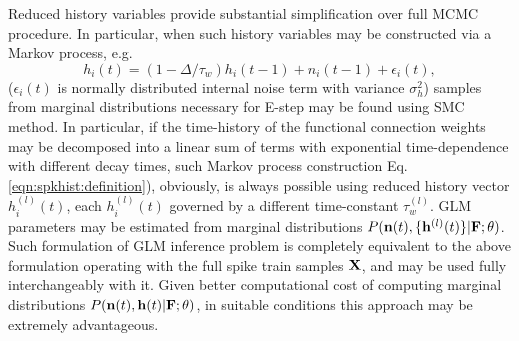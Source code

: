 Reduced history variables provide substantial simplification over full MCMC procedure. In particular, when such history variables may be constructed via a Markov process, e.g.
\begin{equation}\label{eqn:spkhist:definition}
h_i(t)=(1-\Delta/\tau_w) h_i(t-1) + n_i(t-1) + \epsilon_i(t), 
\end{equation}
($\epsilon_i(t)$ is normally distributed internal noise term with variance $\sigma^2_h$) samples from marginal distributions necessary for E-step may be found using SMC method. In particular, if the time-history of the  functional connection weights may be decomposed into a linear sum of  terms with exponential time-dependence with different decay times, such Markov process construction Eq. \eqref{eqn:spkhist:definition}), obviously, is always possible using reduced history vector $h_i^{(l)}(t)$, each $h_i^{(l)}(t)$ governed by a different time-constant $\tau^{(l)}_w$. GLM parameters may be estimated from marginal distributions $P({\bf n}(t), \{{\bf h}^{(l)}(t)\}|{\bf F};\mathbf{\theta})$.  Such formulation of GLM inference problem is completely equivalent to the above formulation operating with the full spike train samples ${\bf X}$, and may be used fully interchangeably with it. Given better computational cost of computing marginal distributions $P({\bf n}(t), {\bf h}(t)|{\bf F};\mathbf{\theta})$, in suitable conditions this approach may be extremely advantageous. 

